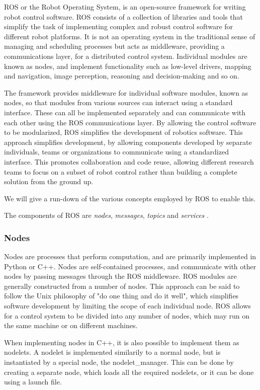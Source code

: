 \documentclass[\rootfolder/main.tex]{subfiles}
\begin{document}
ROS or the Robot Operating System, is an open-source framework for writing robot control software.
ROS consists of a collection of libraries and tools that simplify the task of implementing complex and robust control software for different robot platforms.
It is not an operating system in the traditional sense of managing and scheduling processes but acts as middleware, providing a communications layer, for a distributed control system.
Individual modules are known as nodes, and implement functionality such as low-level drivers, mapping and navigation, image perception, reasoning and decision-making and so on.

The framework provides middleware for individual software modules, known as nodes, so that modules from various sources can interact using a standard interface.
These can all be implemented separately and can communicate with each other using the ROS communications layer.
By allowing the control software to be modularized, ROS simplifies the development of robotics software.
This approach simplifies development, by allowing components developed by separate individuals, teams or organizations to communicate using a standardized interface.
This promotes collaboration and code reuse, allowing different research teams to focus on a subset of robot control rather than building a complete solution from the ground up.

We will give a run-down of the various concepts employed by ROS to enable this.

The components of ROS are \emph{nodes}, \emph{messages}, \emph{topics} and \emph{services} \cite{Quigley2009}.

\subsubsection{Nodes}

Nodes are processes that perform computation, and are primarily implemented in Python or C++.
Nodes are self-contained processes, and communicate with other nodes by passing messages through the ROS middleware.
ROS modules are generally constructed from a number of nodes.
This approach can be said to follow the Unix philosophy of "do one thing and do it well", which simplifies software development by limiting the scope of each individual node.
ROS allows for a control system to be divided into any number of nodes, which may run on the same machine or on different machines.

When implementing nodes in C++, it is also possible to implement them as nodelets.
A nodelet is implemented similarily to a normal node, but is instantiated by a special node, the nodelet\_manager.
This can be done by creating a separate node, which loads all the required nodelets, or it can be done using a launch file.
\end{document}
